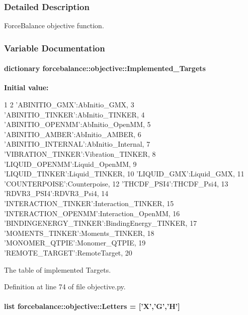 \subsubsection{\-Detailed \-Description}
\-Force\-Balance objective function. 

\subsubsection{\-Variable \-Documentation}
\hypertarget{namespaceforcebalance_1_1objective_aad3b66466fd22980d2c83c67b82ddddf}{
\paragraph[{\-Implemented\-\_\-\-Targets}]{\setlength{\rightskip}{0pt plus 5cm}dictionary {\bf forcebalance\-::objective\-::\-Implemented\-\_\-\-Targets}}}\label{namespaceforcebalance_1_1objective_aad3b66466fd22980d2c83c67b82ddddf}
{\bfseries \-Initial value\-:}
\begin{DoxyCode}
1 {
2     'ABINITIO_GMX':AbInitio_GMX,
3     'ABINITIO_TINKER':AbInitio_TINKER,
4     'ABINITIO_OPENMM':AbInitio_OpenMM,
5     'ABINITIO_AMBER':AbInitio_AMBER,
6     'ABINITIO_INTERNAL':AbInitio_Internal,
7     'VIBRATION_TINKER':Vibration_TINKER,
8     'LIQUID_OPENMM':Liquid_OpenMM,
9     'LIQUID_TINKER':Liquid_TINKER, 
10     'LIQUID_GMX':Liquid_GMX, 
11     'COUNTERPOISE':Counterpoise,
12     'THCDF_PSI4':THCDF_Psi4,
13     'RDVR3_PSI4':RDVR3_Psi4,
14     'INTERACTION_TINKER':Interaction_TINKER,
15     'INTERACTION_OPENMM':Interaction_OpenMM,
16     'BINDINGENERGY_TINKER':BindingEnergy_TINKER,
17     'MOMENTS_TINKER':Moments_TINKER,
18     'MONOMER_QTPIE':Monomer_QTPIE,
19     'REMOTE_TARGET':RemoteTarget,
20     }
\end{DoxyCode}


\-The table of implemented \-Targets. 



\-Definition at line 74 of file objective.\-py.

\hypertarget{namespaceforcebalance_1_1objective_a01660ebc02853011e66350c410e26f0a}{
\paragraph[{\-Letters}]{\setlength{\rightskip}{0pt plus 5cm}list {\bf forcebalance\-::objective\-::\-Letters} = \mbox{[}'\-X','\-G','\-H'\mbox{]}}}\label{namespaceforcebalance_1_1objective_a01660ebc02853011e66350c410e26f0a}


